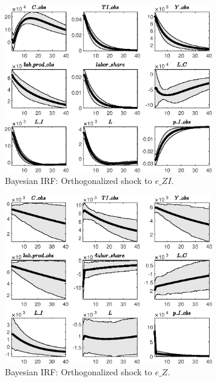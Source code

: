  
\begin{figure}[H]
\centering 
\includegraphics[width=0.80\textwidth]{directed_search_est/Output/directed_search_est_Bayesian_IRF_e_ZI_1}
\caption{Bayesian IRF: Orthogonalized shock to $e\_ZI$.}
\label{Fig:BayesianIRF:e_ZI:1}
\end{figure}
 
\begin{figure}[H]
\centering 
\includegraphics[width=0.80\textwidth]{directed_search_est/Output/directed_search_est_Bayesian_IRF_e_Z_1}
\caption{Bayesian IRF: Orthogonalized shock to $e\_Z$.}
\label{Fig:BayesianIRF:e_Z:1}
\end{figure}
 
